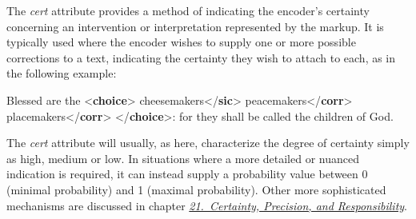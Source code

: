 The {\itshape cert} attribute provides a method of indicating the encoder's certainty concerning an intervention or interpretation represented by the markup. It is typically used where the encoder wishes to supply one or more possible corrections to a text, indicating the certainty they wish to attach to each, as in the following example: \par\bgroup{}\exampleFont \begin{shaded}\noindent\mbox{} Blessed are the {<\textbf{choice}>}\mbox{}\newline 
{}cheesemakers{</\textbf{sic}>}\mbox{}\newline 
{}peacemakers{</\textbf{corr}>}\mbox{}\newline 
{}placemakers{</\textbf{corr}>}\mbox{}\newline 
{</\textbf{choice}>}:\mbox{}\newline 
 for they shall be called the children of God.\end{shaded}\egroup\par \noindent  The {\itshape cert} attribute will usually, as here, characterize the degree of certainty simply as high, medium or low. In situations where a more detailed or nuanced indication is required, it can instead supply a probability value between 0 (minimal probability) and 1 (maximal probability). Other more sophisticated mechanisms are discussed in chapter \textit{\hyperref[CE]{21.\ Certainty, Precision, and Responsibility}}.\par
